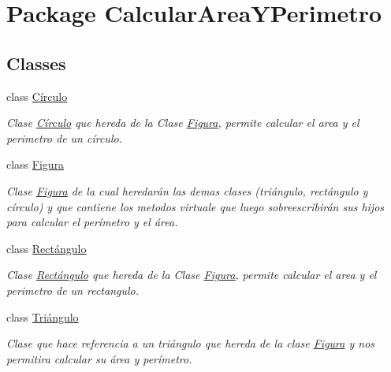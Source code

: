 \hypertarget{namespace_calcular_area_y_perimetro}{}\section{Package Calcular\+Area\+Y\+Perimetro}
\label{namespace_calcular_area_y_perimetro}
\subsection*{Classes}
\begin{DoxyCompactItemize}
\item 
class \hyperlink{class_calcular_area_y_perimetro_1_1_c_xC3_xADrculo}{Círculo}
\begin{DoxyCompactList}\small\item\em Clase \hyperlink{class_calcular_area_y_perimetro_1_1_c_xC3_xADrculo}{Círculo} que hereda de la Clase \hyperlink{class_calcular_area_y_perimetro_1_1_figura}{Figura}, permite calcular el area y el perimetro de un círculo. \end{DoxyCompactList}\item 
class \hyperlink{class_calcular_area_y_perimetro_1_1_figura}{Figura}
\begin{DoxyCompactList}\small\item\em Clase \hyperlink{class_calcular_area_y_perimetro_1_1_figura}{Figura} de la cual heredarán las demas clases (triángulo, rectángulo y círculo) y que contiene los metodos virtuale que luego sobreescribirán sus hijos para calcular el perímetro y el área. \end{DoxyCompactList}\item 
class \hyperlink{class_calcular_area_y_perimetro_1_1_rect_xC3_xA1ngulo}{Rectángulo}
\begin{DoxyCompactList}\small\item\em Clase \hyperlink{class_calcular_area_y_perimetro_1_1_rect_xC3_xA1ngulo}{Rectángulo} que hereda de la Clase \hyperlink{class_calcular_area_y_perimetro_1_1_figura}{Figura}, permite calcular el area y el perimetro de un rectangulo. \end{DoxyCompactList}\item 
class \hyperlink{class_calcular_area_y_perimetro_1_1_tri_xC3_xA1ngulo}{Triángulo}
\begin{DoxyCompactList}\small\item\em Clase que hace referencia a un triángulo que hereda de la clase \hyperlink{class_calcular_area_y_perimetro_1_1_figura}{Figura} y nos permitira calcular su área y perímetro. \end{DoxyCompactList}\end{DoxyCompactItemize}
